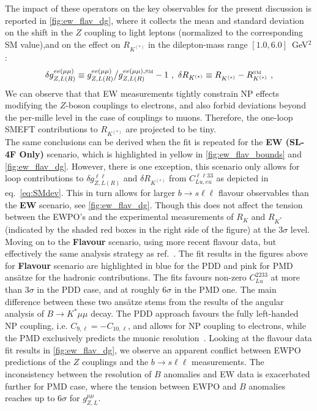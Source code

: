 The impact of these operators on the key observables for the present discussion is reported in \autoref{fig:ew_flav_dg}, where  it collects the mean and standard deviation on the shift in the $Z$ coupling to light leptons (normalized to the corresponding SM value),and on the effect on $R_{K^{(*)}}$ in the dilepton-mass range $[1.0,6.0]$~GeV$^2$: 
\begin{equation}
	\label{eq:SMdev}
	\delta g_{Z,L(R)}^{ee(\mu\mu)} \equiv g_{Z,L(R)}^{ee(\mu\mu)}{\big/}g_{Z,L(R)}^{ee(\mu\mu),\textrm{\tiny SM}}-1  \ , \ \delta R_{K^{(*)}} \equiv R_{K^{(*)}}^{ } - R_{K^{(*)}}^{\textrm{\tiny SM}} \ ,
\end{equation}
We can observe that that EW measurements tightly constrain NP effects modifying the $Z$-boson couplings to electrons, and also forbid deviations beyond the per-mille level in the case of couplings to muons. Therefore, the one-loop SMEFT contributions to $R_{K^{(*)}}$ are projected to be tiny. \\
The same conclusions can be derived when the fit is repeated for the  {\bf EW (SL-4F Only)} scenario, which is highlighted in yellow in \autoref{fig:ew_flav_bounds} and \autoref{fig:ew_flav_dg}. However, there is one exception, this scenario only allows for loop contributions to $\delta g_{Z,L(R)}^{\ell\ell}$ and $\delta R_{K^{(*)}}$ from  $C_{Lu,eu}^{\ell \ell 3 3}$ as depicted in eq.~\eqref{eq:SMdev}. This in turn allows for larger $b \to s  \ell \ell$ flavour observables  than the {\bf EW} scenario, see \autoref{fig:ew_flav_dg}. Though this does not affect the tension between the EWPO's and the experimental measurements of  $R_K$ and $R_{K^*}$ (indicated by the shaded red boxes in the right side of the figure) at the 3$\sigma$ level.\\
Moving on to the {\bf Flavour} scenario, using more recent flavour data, but effectively the same analysis strategy as ref.~\cite{Ciuchini:2019usw}. The fit results in the figures above for {\bf Flavour} scenario are highlighted in blue for the PDD and pink for PMD ans\"atze for the hadronic contributions. The fits favours non-zero $C_{Lu}^{2233}$ at more than 3$\sigma$ in the PDD case, and at roughly 6$\sigma$ in the PMD one. The main difference between these two ans\"atze stems from the results of the angular analysis of $B \to K^{*} \mu \mu$ decay. The PDD approach favours the fully left-handed NP coupling, i.e.  $C_{9, \ell} = - C_{10, \ell}$, and allows for NP coupling to electrons, while the PMD exclusively predicts the muonic resolution~\cite{Ciuchini:2017mik,Ciuchini:2019usw}. Looking at the flavour data fit results in \autoref{fig:ew_flav_dg}, we observe an apparent conflict between EWPO predictions of the $Z$ couplings and the $b \to s \ell \ell$ measurements. The inconsistency between the resolution of $B$ anomalies and EW data is exacerbated further for PMD case, where the tension between EWPO and $B$ anomalies  reaches up to $6\sigma$ for $g^{\mu \mu}_{Z,L}$. \\ 
